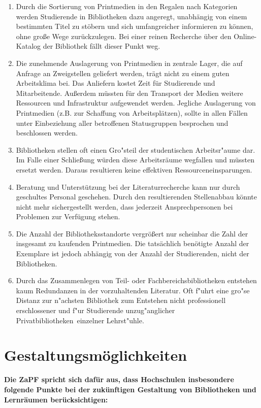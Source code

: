 \documentclass[DIV=calc]{scrartcl}
\begin{document}
\begin{enumerate}
\item Durch die Sortierung von Printmedien in den Regalen nach Kategorien werden Studierende in Bibliotheken dazu angeregt, unabhängig von einem bestimmten Titel zu stöbern und sich umfangreicher informieren zu können, ohne große Wege zurückzulegen.
Bei einer reinen Recherche über den Online-Katalog der Bibliothek fällt dieser Punkt weg.
\item Die zunehmende Auslagerung von Printmedien in zentrale Lager, die auf Anfrage an  Zweigstellen geliefert werden, trägt nicht zu einem guten Arbeitsklima bei.
Das Anliefern kostet Zeit für Studierende und Mitarbeitende.
Außerdem müssten für den Transport der Medien weitere Ressourcen und Infrastruktur aufgewendet werden.
Jegliche Auslagerung von Printmedien (z.B. zur Schaffung von Arbeitsplätzen),  sollte in allen Fällen unter Einbeziehung aller betroffenen Statusgruppen besprochen und beschlossen werden.
\item Bibliotheken stellen oft einen Gro"steil der studentischen Arbeitsr"aume dar.
Im Falle einer Schließung würden diese Arbeitsräume wegfallen und müssten ersetzt werden.
Daraus resultieren keine effektiven Ressourceneinsparungen.
\item Beratung und Unterstützung bei der Literaturrecherche kann nur durch geschultes Personal geschehen.
Durch den resultierenden Stellenabbau könnte nicht mehr sichergestellt werden, dass jederzeit Ansprechpersonen bei Problemen zur Verfügung stehen.
\item Die Anzahl der Bibliotheksstandorte vergrößert nur scheinbar die Zahl der insgesamt zu kaufenden Printmedien.
Die tatsächlich benötigte Anzahl der Exemplare ist jedoch abhängig von der Anzahl der Studierenden, nicht der Bibliotheken.
\item Durch das Zusammenlegen von Teil- oder Fachbereichsbibliotheken entstehen kaum Redundanzen in der vorzuhaltenden Literatur.
Oft f"uhrt eine gro"se Distanz zur n"achsten Bibliothek zum Entstehen nicht professionell erschlossener und f"ur Studierende unzug"anglicher \glqq Privatbibliotheken\grqq\ einzelner Lehrst"uhle.
\end{enumerate}

\section{Gestaltungsmöglichkeiten}

\textbf{Die ZaPF spricht sich dafür aus, dass Hochschulen insbesondere folgende Punkte bei der zukünftigen Gestaltung von Bibliotheken und Lernräumen berücksichtigen:} \\
\end{document}
